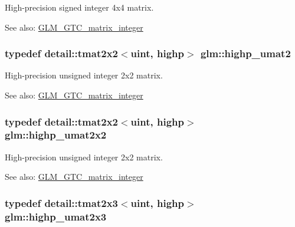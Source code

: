 High-precision signed integer 4x4 matrix. \begin{Desc}
\item[See also:]\hyperlink{group__gtc__matrix__integer}{GLM\_\-GTC\_\-matrix\_\-integer} \end{Desc}
\hypertarget{group__gtc__matrix__integer_g0c89800e3f63f82da4a4159004811cec}{
\subsubsection[highp\_\-umat2]{\setlength{\rightskip}{0pt plus 5cm}typedef detail::tmat2x2$<$uint, highp$>$ {\bf glm::highp\_\-umat2}}}
\label{group__gtc__matrix__integer_g0c89800e3f63f82da4a4159004811cec}


High-precision unsigned integer 2x2 matrix. \begin{Desc}
\item[See also:]\hyperlink{group__gtc__matrix__integer}{GLM\_\-GTC\_\-matrix\_\-integer} \end{Desc}
\hypertarget{group__gtc__matrix__integer_g428410468e33d16dc8aee08b17166669}{
\subsubsection[highp\_\-umat2x2]{\setlength{\rightskip}{0pt plus 5cm}typedef detail::tmat2x2$<$uint, highp$>$ {\bf glm::highp\_\-umat2x2}}}
\label{group__gtc__matrix__integer_g428410468e33d16dc8aee08b17166669}


High-precision unsigned integer 2x2 matrix. \begin{Desc}
\item[See also:]\hyperlink{group__gtc__matrix__integer}{GLM\_\-GTC\_\-matrix\_\-integer} \end{Desc}
\hypertarget{group__gtc__matrix__integer_g309076d055b5511a7071ebb5f660ed83}{
\subsubsection[highp\_\-umat2x3]{\setlength{\rightskip}{0pt plus 5cm}typedef detail::tmat2x3$<$uint, highp$>$ {\bf glm::highp\_\-umat2x3}}}
\label{group__gtc__matrix__integer_g309076d055b5511a7071ebb5f660ed83}


